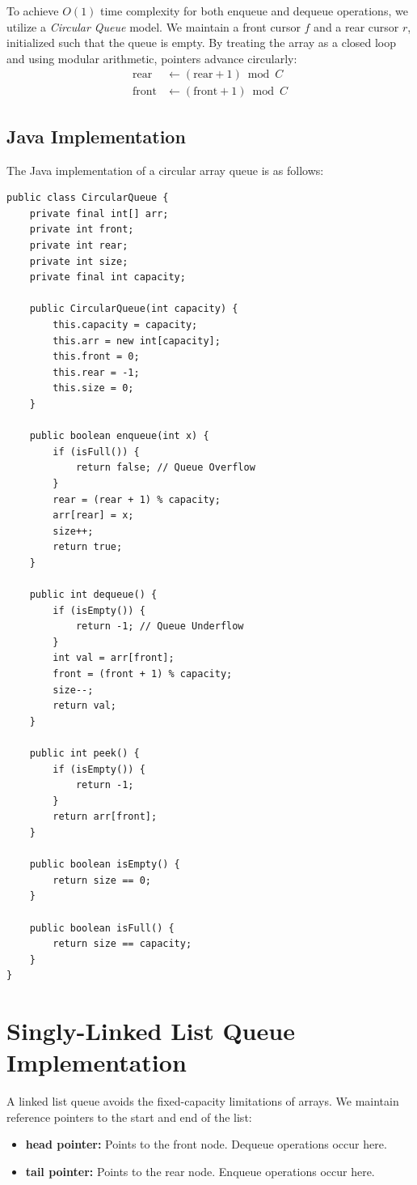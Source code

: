 \documentclass[10pt,journal,compsoc,onecolumn]{IEEEtran}
\begin{document}
To achieve $O(1)$ time complexity for both enqueue and dequeue operations, we utilize a \emph{Circular Queue} model. We maintain a front cursor $f$ and a rear cursor $r$, initialized such that the queue is empty. By treating the array as a closed loop and using modular arithmetic, pointers advance circularly:
\begin{align}
    \mathrm{rear} &\leftarrow (\mathrm{rear} + 1) \bmod C \\
    \mathrm{front} &\leftarrow (\mathrm{front} + 1) \bmod C
\end{align}

\subsection{Java Implementation}
The Java implementation of a circular array queue is as follows:
\begin{verbatim}
public class CircularQueue {
    private final int[] arr;
    private int front;
    private int rear;
    private int size;
    private final int capacity;

    public CircularQueue(int capacity) {
        this.capacity = capacity;
        this.arr = new int[capacity];
        this.front = 0;
        this.rear = -1;
        this.size = 0;
    }

    public boolean enqueue(int x) {
        if (isFull()) {
            return false; // Queue Overflow
        }
        rear = (rear + 1) % capacity;
        arr[rear] = x;
        size++;
        return true;
    }

    public int dequeue() {
        if (isEmpty()) {
            return -1; // Queue Underflow
        }
        int val = arr[front];
        front = (front + 1) % capacity;
        size--;
        return val;
    }

    public int peek() {
        if (isEmpty()) {
            return -1;
        }
        return arr[front];
    }

    public boolean isEmpty() {
        return size == 0;
    }

    public boolean isFull() {
        return size == capacity;
    }
}
\end{verbatim}

\section{Singly-Linked List Queue Implementation}
\label{sec:linked_list_queue}
A linked list queue avoids the fixed-capacity limitations of arrays. We maintain reference pointers to the start and end of the list:
\begin{itemize}
    \item \textbf{head pointer:} Points to the front node. Dequeue operations occur here.
    \item \textbf{tail pointer:} Points to the rear node. Enqueue operations occur here.
\end{itemize}
\end{document}
